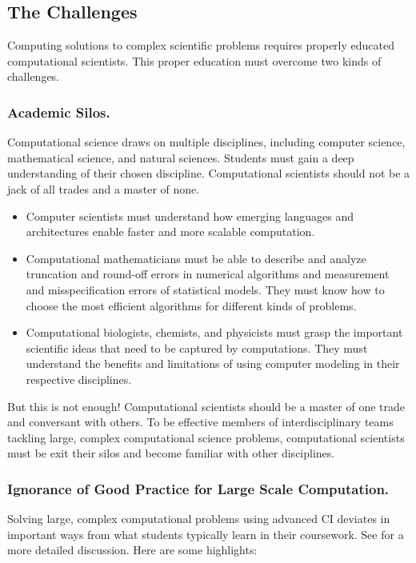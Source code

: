 \documentclass[11pt]{NSFamsart}
\begin{document}
\subsection*{The Challenges}
Computing solutions to complex scientific problems requires properly educated computational scientists.  This proper education must overcome two kinds of challenges.

\subsubsection*{Academic Silos.} Computational science draws on multiple disciplines, including computer science, mathematical science, and natural sciences.  Students must gain a deep understanding of their chosen discipline. Computational scientists should not be a jack of all trades and a master of none.

\begin{itemize}
\item Computer scientists must understand how emerging languages and architectures enable faster and more scalable computation.  

\item Computational mathematicians must be able to describe and analyze truncation and round-off errors in numerical algorithms and measurement and misspecification errors of statistical models.  They must know how to choose the most efficient algorithms for different kinds of problems.

\item Computational biologists, chemists, and physicists must grasp the important scientific ideas that need to be captured by computations.  They must understand the benefits and limitations of using computer modeling in their respective disciplines.

\end{itemize}
But this is not enough!  Computational scientists should be a master of one trade and conversant with others.  To be effective members of interdisciplinary teams tackling large, complex computational science problems, computational scientists must be exit their silos and become familiar with other disciplines.

\subsubsection*{Ignorance of Good Practice for Large Scale Computation.}  Solving large, complex computational problems using advanced CI deviates in important ways from what students typically learn in their coursework. See \cite[Sect.\ 2.4]{RudEtal18a} for a more detailed discussion.  Here are some highlights:
\end{document}
